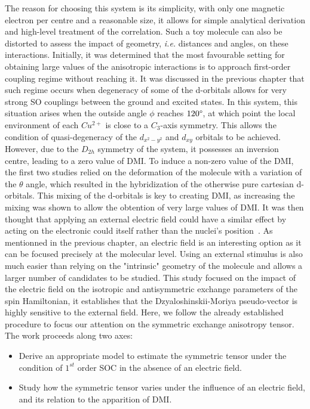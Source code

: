 \documentclass[12pt]{report}
\numberwithin{equation}{section}
\begin{document}
The reason for choosing this system is its simplicity, with only one magnetic electron per centre and a reasonable size, it allows for simple analytical derivation and high-level treatment of the correlation.
Such a toy molecule can also be distorted to assess the impact of geometry, \textit{i.e.} distances and angles, on these interactions.
Initially, it was determined that the most favourable setting for obtaining large values of the anisotropic interactions is to approach first-order coupling regime without reaching it.
It was discussed in the previous chapter that such regime occurs when degeneracy of some of the d-orbitals allows for very strong SO couplings between the ground and excited states.
In this system, this situation arises when the outside angle $\phi$ reaches $120 \degree$, at which point the local environment of each $Cu^{2+}$ is close to a $C_3$-axis symmetry.
This allows the condition of quasi-degeneracy of the $d_{x^2-y^2}$ and $d_{xy}$ orbitals to be achieved. However, due to the $D_{2h}$ symmetry of the system, it possesses an inversion centre, leading to a zero value of DMI.
To induce a non-zero value of the DMI, the first two studies relied on the deformation of the molecule with a variation of the $\theta$ angle, which resulted in the hybridization of the otherwise pure cartesian d-orbitals.
This mixing of the d-orbitals is key to creating DMI, as increasing the mixing was shown to allow the obtention of very large values of DMI.
It was then thought that applying an external electric field could have a similar effect by acting on the electronic could itself rather than the nuclei's position~\cite{pradines_impact_2022}.
As mentionned in the previous chapter, an electric field is an interesting option as it can be focused precisely at the molecular level. 
Using an external stimulus is also much easier than relying on the "intrinsic" geometry of the molecule and allows a larger number of candidates to be studied.
This study focused on the impact of the electric field on the isotropic and antisymmetric exchange parameters of the spin Hamiltonian, it establishes that the Dzyaloshinskii-Moriya pseudo-vector is highly sensitive to the external field.
Here, we follow the already established procedure to focus our attention on the symmetric exchange anisotropy tensor.
The work proceeds along two axes:
\begin{itemize}
    \item[(i)] Derive an appropriate model to estimate the symmetric tensor under the condition of $1^{st}$ order SOC in the absence of an electric field.
    \item[(ii)] Study how the symmetric tensor varies under the influence of an electric field, and its relation to the apparition of DMI.
\end{itemize}
\end{document}
